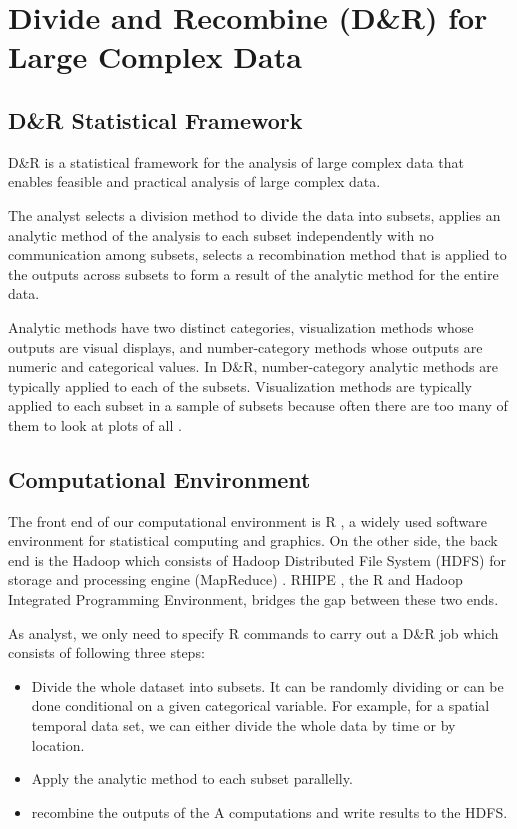 \section{Divide and Recombine (D\&R) for Large Complex Data}

\subsection{D\&R Statistical Framework}

D\&R \cite{Guha:2012} is a statistical framework for the analysis of large complex
data that enables feasible and practical analysis of large complex data. 

The 
analyst selects a division method to divide the data into subsets, applies an 
analytic method of the analysis to each subset independently with no communication
among subsets, selects a recombination method that is applied to the outputs 
across subsets to form a result of the analytic method for the entire data.

Analytic methods have two distinct categories, visualization methods whose outputs
are visual displays, and number-category methods whose outputs are numeric and 
categorical values. In D\&R, number-category analytic methods are typically applied
to each of the subsets. Visualization methods are typically applied to each subset 
in a sample of subsets because often there are too many of them to look at plots 
of all \cite{Hafen:2013}.
 
\subsection{Computational Environment}

The front end of our computational environment is R \cite{R}, a widely used 
software environment for statistical computing and graphics. On the other side, the
back end is the Hadoop which consists of Hadoop Distributed File 
System (HDFS) \cite{HDFS} for storage and processing engine (MapReduce) 
\cite{mapreduce}. RHIPE \cite{Guha:2010}, the R and Hadoop Integrated Programming 
Environment, bridges the gap between these two ends. 

As analyst, we only need to specify R commands to carry out a D\&R job which
consists of following three steps:
\begin{itemize}
\item Divide the whole dataset into subsets. It can be randomly dividing or
can be done conditional on a given categorical variable. For example, for a spatial
temporal data set, we can either divide the whole data by time or by location. 
\item Apply the analytic method to each subset parallelly.   
\item recombine the outputs of the A computations and write results to the HDFS. 
\end{itemize}  

